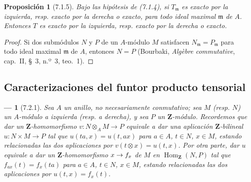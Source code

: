 \documentclass[10pt,oneside,openany]{book}
\theoremstyle{egaenv}\newtheorem*{env}{---}
\theoremstyle{egastatement}
\newtheorem*{proposition}{Proposición}
\theoremstyle{egadescription}
\newcommand{\oldpage}[2][]{\marginnote{\normalfont\scriptsize\textbf{#1}\,|\,#2}\ignorespaces}
\renewcommand{\to}{\mathchoice{\longrightarrow}{\rightarrow}{\rightarrow}{\rightarrow}}
\begin{document}
\begin{proposition}[7.1.5]
Bajo las hipótesis de (7.1.4), si $T_{\mathfrak m}$ es exacto por la izquierda, resp.
exacto por la derecha o exacto, para todo ideal maximal
$\mathfrak m$ de $A$. Entonces $T$ es exacto por la izquierda,
resp. exacto por la derecha o exacto.
\end{proposition}

\begin{proof}
Si dos submódulos $N$ y $P$ de un $A$-módulo $M$ satisfacen
$N_{\mathfrak m}=P_{\mathfrak m}$
para todo ideal maximal $\mathfrak m$ de $A$, entonces $N=P$
(Bourbaki, \emph{Algèbre commutative}, cap.~II, \S~3,
n.º~3, teo.~1).
\end{proof}

\subsection{Caracterizaciones del funtor producto tensorial}
\label{subsection:III.7.2}
\label{subsection:III.7.2.fr}

\begin{env}[7.2.1]
\label{III.7.2.1}
Sea $A$ un anillo, no necesariamente conmutativo; sea $M$
(resp. $N$) un $A$-módulo a izquierda
(resp. a derecha), y sea $P$ un $\mathbf Z$-módulo.
Recordemos que dar un $\mathbf Z$-homomorfismo
$v:N\otimes_A M\longrightarrow P$
equivale a dar una aplicación $\mathbf Z$-bilineal
$u:N\times M\longrightarrow P$
tal que $u(ta,x)=u(t,ax)$ para $a\in A$, $t\in N$, $x\in M$,
estando relacionadas las dos aplicaciones por $v(t\otimes x)=u(t,x)$.
Por otra parte, dar $u$ equivale a dar un
\oldpage[III]{177}
$\mathbf Z$-\emph{homomorfismo}
$x\to f_x$
de $M$ en $\operatorname{Hom}_{\mathbf Z}(N,P)$ tal que
$f_{ax}(t)=f_x(ta)$ para $a\in A$, $t\in N$, $x\in M$,
estando relacionadas las dos aplicaciones por $u(t,x)=f_x(t)$.
\end{env}
\end{document}
